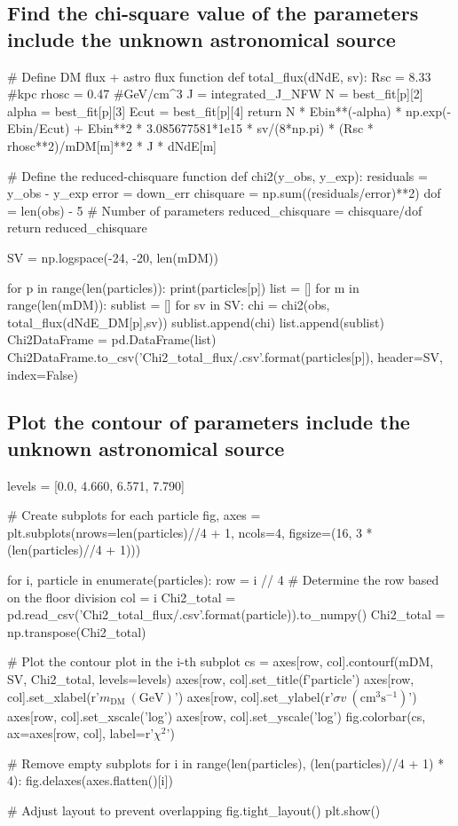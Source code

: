 \documentclass[10pt, oneside]{book}
\numberwithin{equation}{chapter}
\begin{document}
\subsection{Find the chi-square value of the parameters include the unknown astronomical source}
\begin{python}
# Define DM flux + astro flux function
def total_flux(dNdE, sv):
    Rsc = 8.33 #kpc
    rhosc = 0.47 #GeV/cm^3
    J = integrated_J_NFW
    N = best_fit[p][2]
    alpha = best_fit[p][3]
    Ecut = best_fit[p][4]
    return N * Ebin**(-alpha) * np.exp(-Ebin/Ecut) + Ebin**2 * 3.085677581*1e15 * sv/(8*np.pi) * (Rsc * rhosc**2)/mDM[m]**2 * J * dNdE[m]


# Define the reduced-chisquare function
def chi2(y_obs, y_exp):
    residuals = y_obs - y_exp
    error = down_err
    chisquare = np.sum((residuals/error)**2)
    dof = len(obs) - 5 # Number of parameters
    reduced_chisquare = chisquare/dof
    return reduced_chisquare


SV = np.logspace(-24, -20, len(mDM))


for p in range(len(particles)):
    print(particles[p])
    list = []
    for m in range(len(mDM)):
        sublist = []
        for sv in SV:
            chi = chi2(obs, total_flux(dNdE_DM[p],sv))
            sublist.append(chi)
        list.append(sublist)
    Chi2DataFrame = pd.DataFrame(list)
    Chi2DataFrame.to_csv('Chi2_total_flux/{}.csv'.format(particles[p]), header=SV, index=False)
\end{python}

\subsection{Plot the contour of parameters include the unknown astronomical source}
\begin{python}
levels = [0.0, 4.660, 6.571, 7.790]


# Create subplots for each particle
fig, axes = plt.subplots(nrows=len(particles)//4 + 1, ncols=4, figsize=(16, 3 * (len(particles)//4 + 1)))

for i, particle in enumerate(particles):
    row = i // 4  # Determine the row based on the floor division
    col = i %
    Chi2_total = pd.read_csv('Chi2_total_flux/{}.csv'.format(particle)).to_numpy()
    Chi2_total = np.transpose(Chi2_total)

    # Plot the contour plot in the i-th subplot
    cs = axes[row, col].contourf(mDM, SV, Chi2_total, levels=levels)
    axes[row, col].set_title(f'{particle}')
    axes[row, col].set_xlabel(r'$m_{\mathrm{DM}} \ (\mathrm{GeV})$')
    axes[row, col].set_ylabel(r'$\sigma v \ (\mathrm{cm^3 s^{-1}})$')
    axes[row, col].set_xscale('log')
    axes[row, col].set_yscale('log')
    fig.colorbar(cs, ax=axes[row, col], label=r'$\chi^2$')

# Remove empty subplots
for i in range(len(particles), (len(particles)//4 + 1) * 4):
    fig.delaxes(axes.flatten()[i])

# Adjust layout to prevent overlapping
fig.tight_layout()
plt.show()

\end{python}
\end{document}
